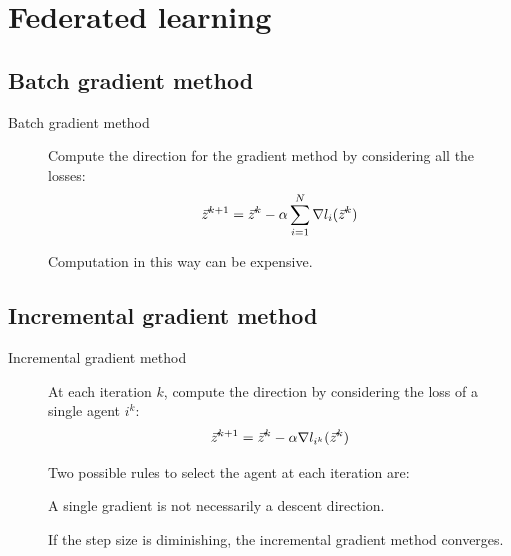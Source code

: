 \section{Federated learning}


\subsection{Batch gradient method}

\begin{description}
    \item[Batch gradient method] 
        Compute the direction for the gradient method by considering all the losses:
        \[
            {\vec{z}}^{k+1} = {\vec{z}}^k - \alpha \sum_{i=1}^{N} \nabla l_i({\vec{z}}^k)
        \]

        \begin{remark}
            Computation in this way can be expensive.
        \end{remark}
\end{description}


\subsection{Incremental gradient method}

\begin{description}
    \item[Incremental gradient method] 
        At each iteration $k$, compute the direction by considering the loss of a single agent $i^k$:
        \[
            {\vec{z}}^{k+1} = {\vec{z}}^k - \alpha \nabla l_{i^k}({\vec{z}}^k)
        \]

        \begin{remark}
            Two possible rules to select the agent at each iteration are:
        \end{remark}

        \begin{remark}
            A single gradient is not necessarily a descent direction.
        \end{remark}

        \begin{theorem}
            If the step size is diminishing, the incremental gradient method converges.
        \end{theorem}
\end{description}


